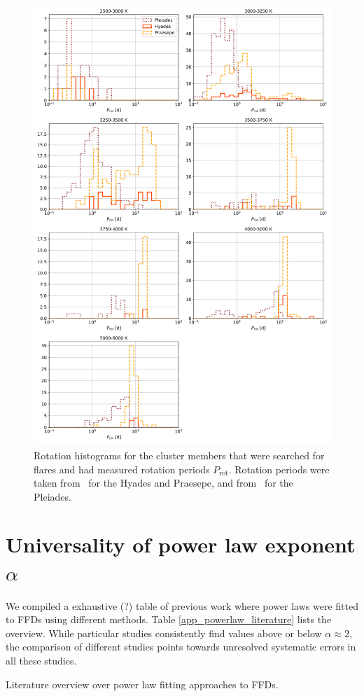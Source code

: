 \documentclass{aa}
\begin{document}
\begin{appendix}
   \begin{figure}
   \centering
            \includegraphics[width=16cm]{pics/rotation/SpT_wise_rotation.png}
         \caption{Rotation histograms for the cluster members that were searched for flares and had measured rotation periods $P_\mathrm{rot}$. Rotation periods were taken from~\citet{douglas2019} for the Hyades and Praesepe, and from~\citet{rebull_pleiadesrot_2016} for the Pleiades.}
          \label{fig:rotation_histogram}
   \end{figure}

\section{Universality of power law exponent $\alpha$}
We compiled a exhaustive (?) table of previous work where power laws were fitted to FFDs using different methods. Table \ref{app_powerlaw_literature} lists the overview. While particular studies consistently find values above or below $\alpha\approx2$, the comparison of different studies points towards unresolved systematic errors in all these studies. \begin{table}
\caption{Literature overview over power law fitting approaches to FFDs.}
\label{app_powerlaw_literature}
\centering

\end{table}

\end{appendix}
\end{document}
